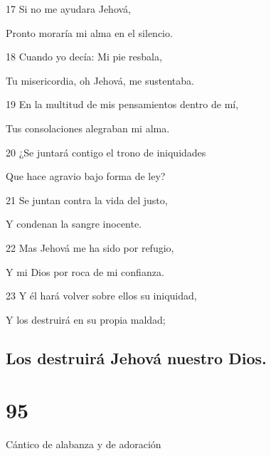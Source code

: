 \par 17 Si no me ayudara Jehová,
\par Pronto moraría mi alma en el silencio.
\par 18 Cuando yo decía: Mi pie resbala,
\par Tu misericordia, oh Jehová, me sustentaba.
\par 19 En la multitud de mis pensamientos dentro de mí,
\par Tus consolaciones alegraban mi alma.
\par 20 ¿Se juntará contigo el trono de iniquidades
\par Que hace agravio bajo forma de ley?
\par 21 Se juntan contra la vida del justo,
\par Y condenan la sangre inocente.
\par 22 Mas Jehová me ha sido por refugio,
\par Y mi Dios por roca de mi confianza.
\par 23 Y él hará volver sobre ellos su iniquidad,
\par Y los destruirá en su propia maldad;
\section*{Los destruirá Jehová nuestro Dios.}

\chapter{95}

\par Cántico de alabanza y de adoración

